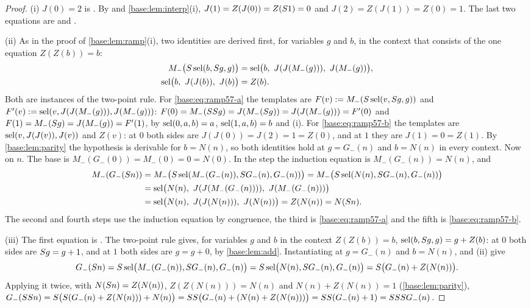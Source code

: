 \begin{proof}
(i) $J(0)=2$ is .  By  and
\cref{base:lem:interp}(i), $J(1)=Z(J(0))=Z(S 1)=0$ and
$J(2)=Z(J(1))=Z(0)=1$.  The last two equations are  and
.

(ii) As in the proof of \cref{base:lem:ramp}(i), two identities are derived
first, for variables $g$ and $b$, in the context that consists of the one
equation $Z(Z(b))=b$:
\begin{align}
 M_-\bigl(S\operatorname{sel}(b,S g,g)\bigr)
 &=\operatorname{sel}\bigl(b,\ J(J(M_-(g))),\ J(M_-(g))\bigr), \label{base:eq:ramp57-a}\\
 \operatorname{sel}\bigl(b,\ J(J(b)),\ J(b)\bigr)&=Z(b). \label{base:eq:ramp57-b}
\end{align}
Both are instances of the two-point rule.  For \eqref{base:eq:ramp57-a} the
templates are $F(v)\mathrel{:=} M_-(S\operatorname{sel}(v,S g,g))$ and
$F'(v)\mathrel{:=}\operatorname{sel}(v,J(J(M_-(g))),J(M_-(g)))$:
$F(0)=M_-(SS g)=J(M_-(S g))=J(J(M_-(g)))=F'(0)$ and
$F(1)=M_-(S g)=J(M_-(g))=F'(1)$, by $\operatorname{sel}(0,a,b)=a$, $\operatorname{sel}(1,a,b)=b$
and (i).  For \eqref{base:eq:ramp57-b} the templates are
$\operatorname{sel}(v,J(J(v)),J(v))$ and $Z(v)$: at $0$ both sides are $J(J(0))=J(2)=1=Z(0)$,
and at $1$ they are $J(1)=0=Z(1)$.  By \cref{base:lem:parity} the hypothesis
is derivable for $b=N(n)$, so both identities hold at $g=G_-(n)$ and
$b=N(n)$ in every context.  Now  on $n$.  The base is
$M_-(G_-(0))=M_-(0)=0=N(0)$.  In the step the induction equation is
$M_-(G_-(n))=N(n)$, and
\begin{align*}
 M_-(G_-(S n))
 &=M_-\bigl(S\operatorname{sel}(M_-(G_-(n)),S G_-(n),G_-(n))\bigr)
  =M_-\bigl(S\operatorname{sel}(N(n),S G_-(n),G_-(n))\bigr)\\
 &=\operatorname{sel}\bigl(N(n),\ J(J(M_-(G_-(n)))),\ J(M_-(G_-(n)))\bigr)\\
 &=\operatorname{sel}\bigl(N(n),\ J(J(N(n))),\ J(N(n))\bigr)=Z(N(n))=N(S n).
\end{align*}
The second and fourth steps use the induction equation by congruence, the
third is \eqref{base:eq:ramp57-a} and the fifth is \eqref{base:eq:ramp57-b}.

(iii) The first equation is .  The two-point rule gives, for
variables $g$ and $b$ in the context $Z(Z(b))=b$,
$\operatorname{sel}(b,S g,g)=g+Z(b)$: at $0$ both sides are $S g=g+1$, and at $1$
both sides are $g=g+0$, by \cref{base:lem:add}.  Instantiating at
$g=G_-(n)$ and $b=N(n)$,  and (ii) give
\[
 G_-(S n)=S\operatorname{sel}\bigl(M_-(G_-(n)),S G_-(n),G_-(n)\bigr)
 =S\operatorname{sel}\bigl(N(n),S G_-(n),G_-(n)\bigr)=S\bigl(G_-(n)+Z(N(n))\bigr).
\]
Applying it twice, with $N(S n)=Z(N(n))$, $Z(Z(N(n)))=N(n)$ and
$N(n)+Z(N(n))=1$ (\cref{base:lem:parity}),
$G_-(SS n)=S\bigl(S(G_-(n)+Z(N(n)))+N(n)\bigr)
 =SS\bigl(G_-(n)+(N(n)+Z(N(n)))\bigr)=SS(G_-(n)+1)
 =SSS G_-(n)$.


\end{proof}
